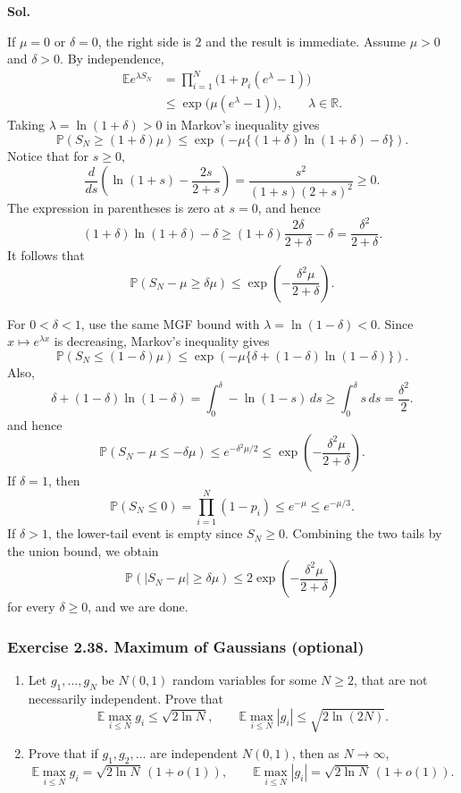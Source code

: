 \documentclass[lang=en,11pt,a4paper,citestyle=authoryear,nobib=true]{elegantpaper}
\newcommand{\R}{\mathbb{R}}
\newcommand{\E}{\mathbb{E}}
\renewcommand{\P}{\mathbb{P}}
\begin{document}
\par\vspace{0.5em}\noindent\textbf{Sol.}\par
If $\mu=0$ or $\delta=0$, the right side is $2$ and the result is
immediate. Assume $\mu>0$ and $\delta>0$. By independence,
\[
\begin{aligned}
\E e^{\lambda S_N}
&=\prod_{i=1}^N\bigl(1+p_i(e^\lambda-1)\bigr)\\
&\le\exp\bigl(\mu(e^\lambda-1)\bigr),
\qquad\lambda\in\R.
\end{aligned}
\]
Taking $\lambda=\ln(1+\delta)>0$ in Markov's inequality gives
\[
\P(S_N\ge(1+\delta)\mu)
\le\exp\left(-\mu\{(1+\delta)\ln(1+\delta)-\delta\}\right).
\]
Notice that for $s\ge0$,
\[
\frac{d}{ds}\left(\ln(1+s)-\frac{2s}{2+s}\right)
=\frac{s^2}{(1+s)(2+s)^2}\ge0.
\]
The expression in parentheses is zero at $s=0$, and hence
\[
(1+\delta)\ln(1+\delta)-\delta
\ge(1+\delta)\frac{2\delta}{2+\delta}-\delta
=\frac{\delta^2}{2+\delta}.
\]
It follows that
\[
\P(S_N-\mu\ge\delta\mu)
\le\exp\left(-\frac{\delta^2\mu}{2+\delta}\right).
\]

For $0<\delta<1$, use the same MGF bound with
$\lambda=\ln(1-\delta)<0$. Since $x\mapsto e^{\lambda x}$ is decreasing,
Markov's inequality gives
\[
\P(S_N\le(1-\delta)\mu)
\le\exp\left(-\mu\{\delta+(1-\delta)\ln(1-\delta)\}\right).
\]
Also,
\[
\delta+(1-\delta)\ln(1-\delta)
=\int_0^\delta-\ln(1-s)\,ds
\ge\int_0^\delta s\,ds=\frac{\delta^2}{2}.
\]
and hence
\[
\P(S_N-\mu\le-\delta\mu)
\le e^{-\delta^2\mu/2}
\le\exp\left(-\frac{\delta^2\mu}{2+\delta}\right).
\]
If $\delta=1$, then
\[
\P(S_N\le0)=\prod_{i=1}^N(1-p_i)\le e^{-\mu}\le e^{-\mu/3}.
\]
If $\delta>1$, the lower-tail event is empty since $S_N\ge0$.
Combining the two tails by the union bound, we obtain
\[
\P(|S_N-\mu|\ge\delta\mu)
\le2\exp\left(-\frac{\delta^2\mu}{2+\delta}\right)
\]
for every $\delta\ge0$, and we are done.
\vspace{1em}

\subsubsection*{Exercise 2.38. Maximum of Gaussians (optional)}
\begin{enumerate}[label=(\alph*),leftmargin=*]
\item Let $g_1,\ldots,g_N$ be $N(0,1)$ random variables for some $N\ge2$,
that are not necessarily independent. Prove that
\[
\E\max_{i\le N}g_i\le\sqrt{2\ln N},
\qquad
\E\max_{i\le N}|g_i|\le\sqrt{2\ln(2N)}.
\]
\item Prove that if $g_1,g_2,\ldots$ are independent $N(0,1)$, then
as $N\to\infty$,
\[
\E\max_{i\le N}g_i=\sqrt{2\ln N}\,(1+o(1)),
\qquad
\E\max_{i\le N}|g_i|=\sqrt{2\ln N}\,(1+o(1)).
\]
\end{enumerate}
\end{document}
